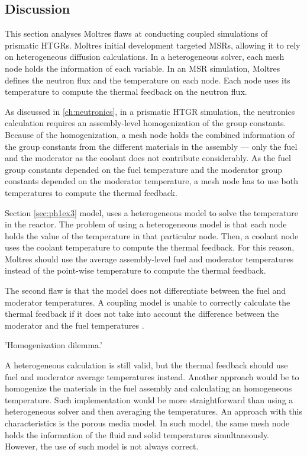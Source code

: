 \subsection{Discussion}

This section analyses Moltres flaws at conducting coupled simulations of prismatic HTGRs.
Moltres initial development targeted MSRs, allowing it to rely on heterogeneous diffusion calculations.
In a heterogeneous solver, each mesh node holds the information of each variable.
In an MSR simulation, Moltres defines the neutron flux and the temperature on each node.
Each node uses its temperature to compute the thermal feedback on the neutron flux.

As discussed in \ref{ch:neutronics}, in a prismatic HTGR simulation, the neutronics calculation requires an assembly-level homogenization of the group constants.
Because of the homogenization, a mesh node holds the combined information of the group constants from the different materials in the assembly --- only the fuel and the moderator as the coolant does not contribute considerably.
As the fuel group constants depended on the fuel temperature and the moderator group constants depended on the moderator temperature, a mesh node has to use both temperatures to compute the thermal feedback.

Section \ref{sec:ph1ex3} model, uses a heterogeneous model to solve the temperature in the reactor.
The problem of using a heterogeneous model is that each node holds the value of the temperature in that particular node.
Then, a coolant node uses the coolant temperature to compute the thermal feedback.
For this reason, Moltres should use the average assembly-level fuel and moderator temperatures instead of the point-wise temperature to compute the thermal feedback.

The second flaw is that the model does not differentiate between the fuel and moderator temperatures.
A coupling model is unable to correctly calculate the thermal feedback if it does not take into account the difference between the moderator and the fuel temperatures \cite{damian_vhtr_2008}.

'Homogenization dilemma.'


A heterogeneous calculation is still valid, but the thermal feedback should use fuel and moderator average temperatures instead.
Another approach would be to homogenize the materials in the fuel assembly and calculating an homogeneous temperature.
Such implementation would be more straightforward than using a heterogeneous solver and then averaging the temperatures.
An approach with this characteristics is the porous media model.
In such model, the same mesh node holds the information of the fluid and solid temperatures simultaneously.
However, the use of such model is not always correct.

